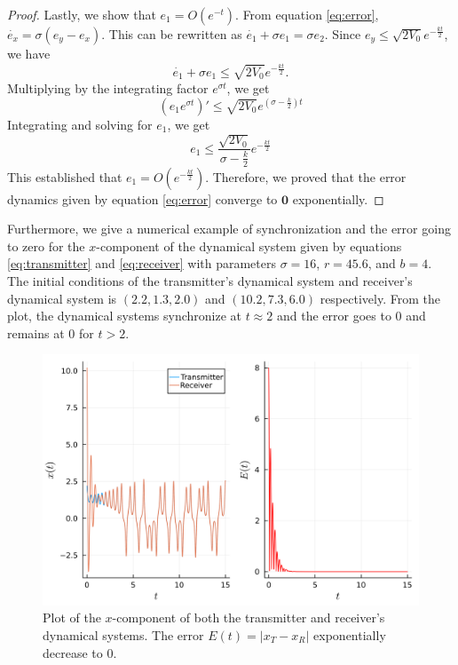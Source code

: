 \documentclass[12pt]{article}
\begin{document}
\begin{proof}
        Lastly, we show that $e_1 = O(e^{-t})$. From equation \ref{eq:error}, $\dot{e_x} = \sigma (e_y - e_x)$. This can be rewritten as $\dot{e_1} + \sigma e_1 = \sigma e_2$. Since $e_y \leq \sqrt{2V_0} e^{-\frac{kt}{2}}$, we have 
        \begin{equation*} 
          \dot{e_1} + \sigma e_1 \leq \sqrt{2V_0} e^{-\frac{kt}{2}}. 
        \end{equation*}
        Multiplying by the integrating factor $e^{\sigma t}$, we get 
        \begin{equation*} 
          (e_1 e^{\sigma t})' \leq \sqrt{2V_0} e^{\left( \sigma - \frac{k}{2} \right)t} 
        \end{equation*}
        Integrating and solving for $e_1$, we get 
        \begin{equation*} 
          e_1 \leq \frac{\sqrt{2V_0}}{\sigma - \frac{k}{2}} e^{-\frac{kt}{2}}
        \end{equation*}
        This established that $e_1 = O(e^{-\frac{kt}{2}})$. Therefore, we proved that the error dynamics given by equation \ref{eq:error} converge to $\mathbf{0}$ exponentially. 
      \end{proof}
      Furthermore, we give a numerical example of synchronization and the error going to zero for the $x$-component of the dynamical system given by equations \ref{eq:transmitter} and \ref{eq:receiver} with parameters $\sigma = 16$, $r=45.6$, and $b = 4$. The initial conditions of the transmitter's dynamical system and receiver's dynamical system is $(2.2, 1.3, 2.0)$ and $(10.2, 7.3, 6.0)$ respectively. From the plot, the dynamical systems synchronize at $t \approx 2$ and the error goes to $0$ and remains at $0$ for $t > 2$. 
      \begin{figure}[H]
          \includegraphics[width=\linewidth]{figures/combined_plot.png}
          \centering
          \caption{Plot of the $x$-component of both the transmitter and receiver's dynamical systems. The error $E(t) = |x_T - x_R|$ exponentially decrease to $0$.}
      \end{figure}
\end{document}
